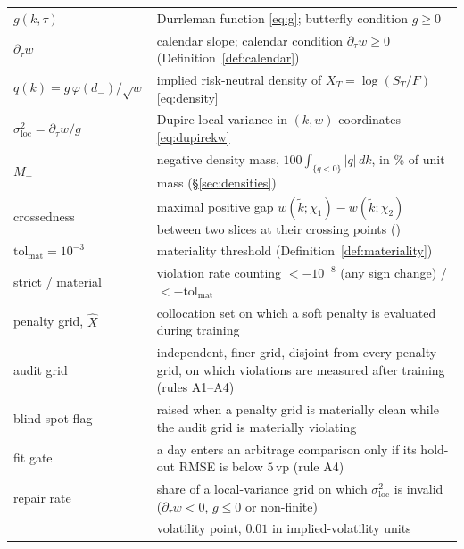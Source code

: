 \documentclass[11pt,a4paper]{report}
\theoremstyle{definition}
\theoremstyle{remark}
\theoremstyle{plain}
\newcommand{\vp}{\text{vp}} %
\begin{document}
\noindent\begin{tabular}{@{}p{}@{\hspace{6pt}}p{}@{}}
\toprule
$g(k,\tau)$ & Durrleman function \eqref{eq:g}; butterfly condition $g\ge0$ \\
$\partial_\tau w$ & calendar slope; calendar condition $\partial_\tau w\ge0$ (Definition~\ref{def:calendar}) \\
$q(k)=g\,\varphi(d_-)/\sqrt w$ & implied risk-neutral density of $X_T=\log(S_T/F)$ \eqref{eq:density} \\
$\sigma_{\mathrm{loc}}^{2}=\partial_\tau w/g$ & Dupire local variance in $(k,w)$ coordinates \eqref{eq:dupirekw} \\
$M_{-}$ & negative density mass, $100\int_{\{q<0\}}|q|\,dk$, in \% of unit mass (\S\ref{sec:densities}) \\
crossedness & maximal positive gap $w(\tilde k;\chi_1)-w(\tilde k;\chi_2)$ between two slices at their crossing points (\cite[Def.~5.1]{gatheraljacquier2014}) \\
$\mathrm{tol}_{\mathrm{mat}}=10^{-3}$ & materiality threshold (Definition~\ref{def:materiality}) \\
strict / material & violation rate counting $<-10^{-8}$ (any sign change) / $<-\mathrm{tol}_{\mathrm{mat}}$ \\
penalty grid, $\hat X$ & collocation set on which a soft penalty is evaluated during training \\
audit grid & independent, finer grid, disjoint from every penalty grid, on which violations are measured after training (rules A1--A4) \\
blind-spot flag & raised when a penalty grid is materially clean while the audit grid is materially violating \\
fit gate & a day enters an arbitrage comparison only if its hold-out RMSE is below $5\,\vp$ (rule A4) \\
repair rate & share of a local-variance grid on which $\sigma_{\mathrm{loc}}^2$ is invalid ($\partial_\tau w<0$, $g\le0$ or non-finite) \\
\vp & volatility point, $0.01$ in implied-volatility units \\
\bottomrule
\end{tabular}
\end{document}
